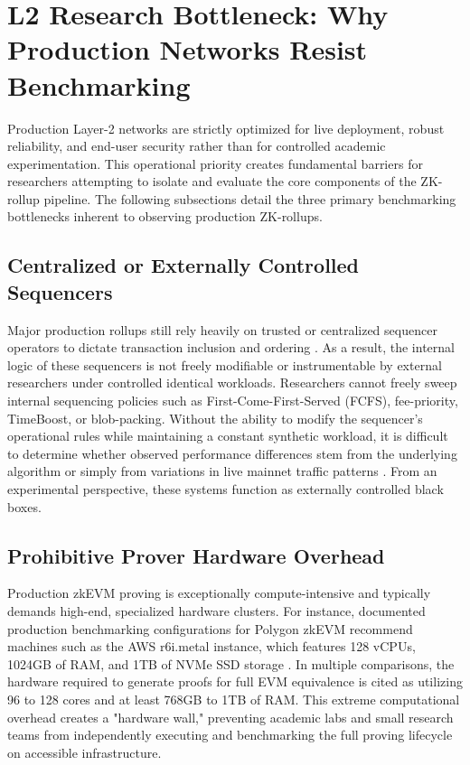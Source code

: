 \section{L2 Research Bottleneck: Why Production Networks Resist Benchmarking}
\label{sec:l2_research_bottleneck}

Production Layer-2 networks are strictly optimized for live deployment, robust reliability, and end-user security rather than for controlled academic experimentation. This operational priority creates fundamental barriers for researchers attempting to isolate and evaluate the core components of the ZK-rollup pipeline. The following subsections detail the three primary benchmarking bottlenecks inherent to observing production ZK-rollups.

\subsection{Centralized or Externally Controlled Sequencers}
Major production rollups still rely heavily on trusted or centralized sequencer operators to dictate transaction inclusion and ordering \citep{chaliasos2024analyzing}. As a result, the internal logic of these sequencers is not freely modifiable or instrumentable by external researchers under controlled identical workloads. Researchers cannot freely sweep internal sequencing policies such as First-Come-First-Served (FCFS), fee-priority, TimeBoost, or blob-packing. Without the ability to modify the sequencer's operational rules while maintaining a constant synthetic workload, it is difficult to determine whether observed performance differences stem from the underlying algorithm or simply from variations in live mainnet traffic patterns \citep{motepalli2023sequencers}. From an experimental perspective, these systems function as externally controlled black boxes.

\subsection{Prohibitive Prover Hardware Overhead}
Production zkEVM proving is exceptionally compute-intensive and typically demands high-end, specialized hardware clusters. For instance, documented production benchmarking configurations for Polygon zkEVM recommend machines such as the AWS r6i.metal instance, which features 128 vCPUs, 1024GB of RAM, and 1TB of NVMe SSD storage \citep{chaliasos2024analyzing}. In multiple comparisons, the hardware required to generate proofs for full EVM equivalence is cited as utilizing 96 to 128 cores and at least 768GB to 1TB of RAM. This extreme computational overhead creates a "hardware wall," preventing academic labs and small research teams from independently executing and benchmarking the full proving lifecycle on accessible infrastructure.

